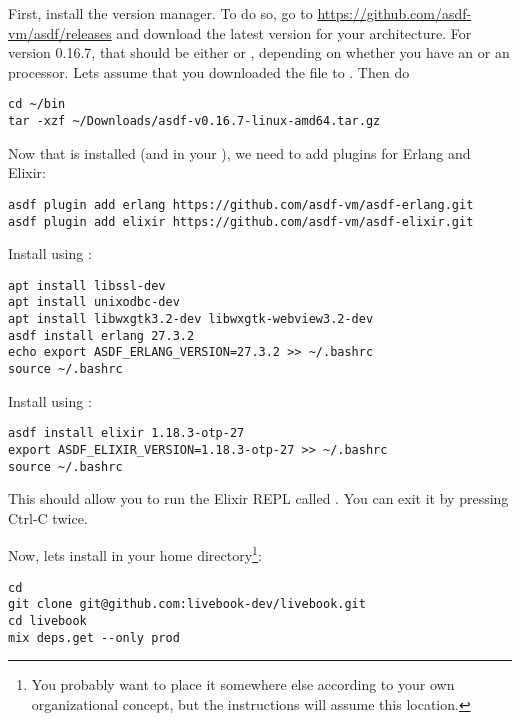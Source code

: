 First, install the  version manager. To do so, go to \url{https://github.com/asdf-vm/asdf/releases} and download the latest version for your architecture. For version 0.16.7, that should be either  or , depending on whether you have an  or an  processor. Lets assume that you downloaded the  file to . Then do

\begin{verbatim}
cd ~/bin
tar -xzf ~/Downloads/asdf-v0.16.7-linux-amd64.tar.gz
\end{verbatim}

Now that  is installed (and in your ), we need to add plugins for Erlang and Elixir:

\begin{verbatim}
asdf plugin add erlang https://github.com/asdf-vm/asdf-erlang.git
asdf plugin add elixir https://github.com/asdf-vm/asdf-elixir.git
\end{verbatim}

Install  using :

\begin{verbatim}
apt install libssl-dev
apt install unixodbc-dev
apt install libwxgtk3.2-dev libwxgtk-webview3.2-dev
asdf install erlang 27.3.2
echo export ASDF_ERLANG_VERSION=27.3.2 >> ~/.bashrc
source ~/.bashrc
\end{verbatim}

Install  using :

\begin{verbatim}
asdf install elixir 1.18.3-otp-27
export ASDF_ELIXIR_VERSION=1.18.3-otp-27 >> ~/.bashrc
source ~/.bashrc
\end{verbatim}

This should allow you to run the Elixir REPL called . You can exit it by pressing Ctrl-C twice.

Now, lets install  in your home directory\footnote{You probably want to place it somewhere else according to your own organizational concept, but the instructions will assume this location.}:

\begin{verbatim}
cd
git clone git@github.com:livebook-dev/livebook.git
cd livebook
mix deps.get --only prod
\end{verbatim}

